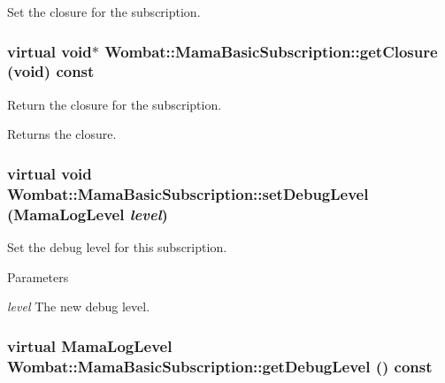 Set the closure for the subscription. \hypertarget{classWombat_1_1MamaBasicSubscription_a601750648cc71247df752f904aaf5e1c}{
\subsubsection[{getClosure}]{\setlength{\rightskip}{0pt plus 5cm}virtual void$\ast$ Wombat::MamaBasicSubscription::getClosure (void) const}}
\label{classWombat_1_1MamaBasicSubscription_a601750648cc71247df752f904aaf5e1c}


Return the closure for the subscription. \begin{DoxyReturn}{Returns}
the closure. 
\end{DoxyReturn}
\hypertarget{classWombat_1_1MamaBasicSubscription_a1cf68138c6df48e9bb5fbfa1e4242fb5}{
\subsubsection[{setDebugLevel}]{\setlength{\rightskip}{0pt plus 5cm}virtual void Wombat::MamaBasicSubscription::setDebugLevel (MamaLogLevel {\em level})}}
\label{classWombat_1_1MamaBasicSubscription_a1cf68138c6df48e9bb5fbfa1e4242fb5}


Set the debug level for this subscription. 
\begin{DoxyParams}{Parameters}
\item[{\em level}]The new debug level. \end{DoxyParams}
\hypertarget{classWombat_1_1MamaBasicSubscription_a7ed1a681895a09661866d56682b9faba}{
\subsubsection[{getDebugLevel}]{\setlength{\rightskip}{0pt plus 5cm}virtual MamaLogLevel Wombat::MamaBasicSubscription::getDebugLevel () const}}
\label{classWombat_1_1MamaBasicSubscription_a7ed1a681895a09661866d56682b9faba}


